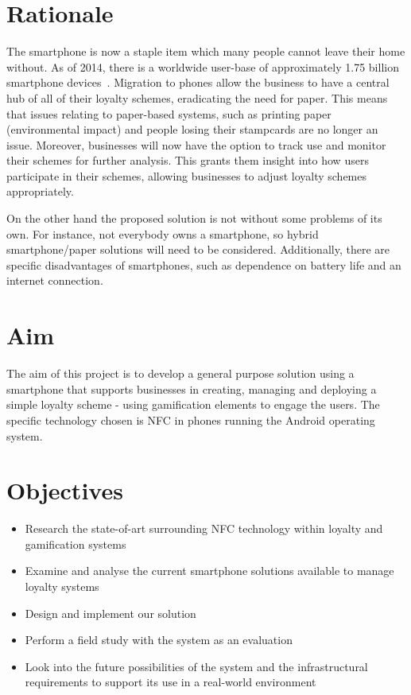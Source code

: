 \section{Rationale}
The smartphone is now a staple item which many people cannot leave their home without. As of 2014, there is a worldwide user-base of approximately 1.75 billion smartphone devices~\cite{smartUsers}. Migration to phones allow the business to have a central hub of all of their loyalty schemes, eradicating the need for paper. This means that issues relating to paper-based systems, such as printing paper (environmental impact) and people losing their stampcards are no longer an issue. Moreover, businesses will now have the option to track use and monitor their schemes for further analysis. This grants them insight into how users participate in their schemes, allowing businesses to adjust loyalty schemes appropriately.

On the other hand the proposed solution is not without some problems of its own. For instance, not everybody owns a smartphone, so hybrid smartphone/paper solutions will need to be considered. Additionally, there are specific disadvantages of smartphones, such as dependence on battery life and an internet connection.

\section{Aim}
The aim of this project is to develop a general purpose solution using a smartphone that supports businesses in creating, managing and deploying a simple loyalty scheme - using gamification elements to engage the users. The specific technology chosen is NFC in phones running the Android operating system. 

\section{Objectives}
\label{sec:objectives}
\begin{itemize}
    \item Research the state-of-art surrounding NFC technology within loyalty and gamification systems
    \item Examine and analyse the current smartphone solutions available to manage loyalty systems
    \item Design and implement our solution
    \item Perform a field study with the system as an evaluation
    \item Look into the future possibilities of the system and the infrastructural requirements to support its use in a real-world environment
\end{itemize}


